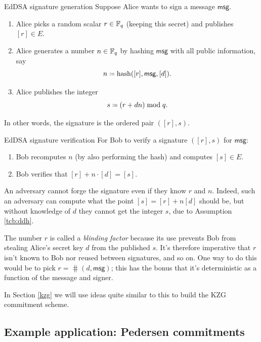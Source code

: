\begin{algo}{EdDSA signature generation}{}
Suppose Alice wants to sign a message $\textsf{msg}$.

\begin{enumerate}
\item
  Alice picks a random scalar $r \in \mathbb{F}_{q}$ (keeping this
  secret) and publishes $[r] \in E$.
\item
  Alice generates a number $n \in \mathbb{F}_{q}$ by hashing
  $\textsf{msg}$ with all public information, say
  \[ n \defeq \hash([r],\textsf{msg},[d]). \]
\item
  Alice publishes the integer \[ s \defeq (r + dn) \bmod q. \]
\end{enumerate}

In other words, the signature is the ordered pair
$( [r],s )$.
\end{algo}

\begin{algo}{EdDSA signature verification}{}
For Bob to verify a signature
$( [r],s )$ for $\textsf{msg}$:

\begin{enumerate}
\item
  Bob recomputes $n$ (by also performing the hash) and computes
  $[s] \in E$.
\item
  Bob verifies that
  $[r] + n \cdot [d] = [s]$.
\end{enumerate}
\end{algo}

An adversary cannot forge the signature even if they know $r$ and
$n$. Indeed, such an adversary can compute what the point
$[s] = [r] + n[d]$ should be,
but without knowledge of $d$ they cannot get the integer $s$, due to
Assumption \ref{tcb:ddh}.

The number $r$ is called a \emph{blinding factor} because its use
prevents Bob from stealing Alice's secret key $d$ from the published
$s$. It's therefore imperative that $r$ isn't known to Bob nor
reused between signatures, and so on. One way to do this would be to
pick $r = \hash(d,\textsf{msg})$; this has the
bonus that it's deterministic as a function of the message and signer.

In Section \ref{kzg} we will use ideas quite similar to this to build the KZG
commitment scheme.

\subsection{Example application: Pedersen commitments}
\label{pedersen}

